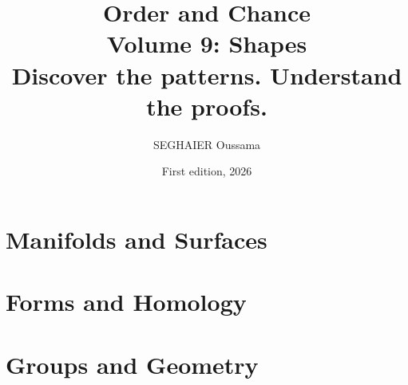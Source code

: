 \documentclass[11pt,openany]{book}
\title{\Huge\textbf{Order and Chance}\\[0.4em]\LARGE Volume 9: Shapes\\[0.6em]
\Large Discover the patterns. Understand the proofs.}
\author{SEGHAIER Oussama}
\date{First edition, 2026}
\begin{document}
\frontmatter
\makecover
\maketitle

\tableofcontents

\mainmatter

\part{Manifolds and Surfaces}


\part{Forms and Homology}




\part{Groups and Geometry}





\appendix












\end{document}
